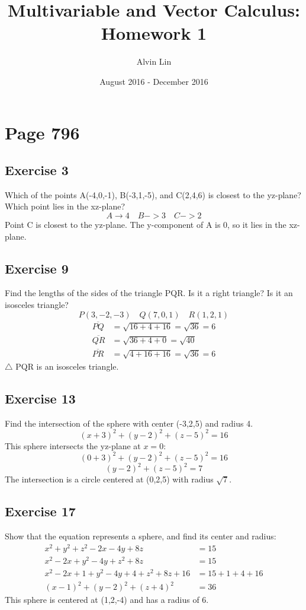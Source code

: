 \documentclass{math}
\title{Multivariable and Vector Calculus: Homework 1}
\author{Alvin Lin}
\date{August 2016 - December 2016}
\begin{document}
\maketitle

\section*{Page 796}

\subsection*{Exercise 3}
Which of the points A(-4,0,-1), B(-3,1,-5), and C(2,4,6) is closest to the
yz-plane? Which point lies in the xz-plane?
\[ A \to 4 \quad B -> 3 \quad C -> 2 \]
Point C is closest to the yz-plane. The y-component of A is 0, so it lies in the
xz-plane.

\subsection*{Exercise 9}
Find the lengths of the sides of the triangle PQR. Is it a right triangle?
Is it an isosceles triangle?
\[ P(3,-2,-3) \quad Q(7,0,1) \quad R(1,2,1) \]
\begin{align*}
  \overline{PQ} &= \sqrt{16+4+16} = \sqrt{36} = 6 \\
  \overline{QR} &= \sqrt{36+4+0} = \sqrt{40} \\
  \overline{PR} &= \sqrt{4+16+16} = \sqrt{36} = 6
\end{align*}
\( \triangle \) PQR is an isosceles triangle.

\subsection*{Exercise 13}
Find the intersection of the sphere with center (-3,2,5) and radius 4.
\[ (x+3)^2+(y-2)^2+(z-5)^2 = 16 \]
This sphere intersects the yz-plane at \( x = 0 \):
\[ (0+3)^2+(y-2)^2+(z-5)^2 = 16 \]
\[ (y-2)^2+(z-5)^2 = 7 \]
The intersection is a circle centered at (0,2,5) with radius \( \sqrt{7} \).

\subsection*{Exercise 17}
Show that the equation represents a sphere, and find its center and radius:
\begin{align*}
  x^2+y^2+z^2-2x-4y+8z &= 15 \\
  x^2-2x+y^2-4y+z^2+8z &= 15 \\
  x^2-2x+1+y^2-4y+4+z^2+8z+16 &= 15+1+4+16 \\
  (x-1)^2+(y-2)^2+(z+4)^2 &= 36
\end{align*}
This sphere is centered at (1,2,-4) and has a radius of 6.
\end{document}
